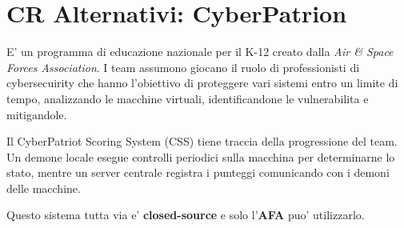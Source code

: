 \section{CR Alternativi:
CyberPatrion}\label{cr-alternativi-cyberpatrion}

E' un programma di educazione nazionale per il K-12 creato dalla
\emph{Air \& Space Forces Association}. I team assumono giocano il ruolo
di professionisti di cybersecuirity che hanno l'obiettivo di proteggere
vari sistemi entro un limite di tempo, analizzando le macchine virtuali,
identificandone le vulnerabilita e mitigandole.

Il CyberPatriot Scoring System (CSS) tiene traccia della progressione
del team. Un demone locale esegue controlli periodici sulla macchina per
determinarne lo stato, mentre un server centrale registra i punteggi
comunicando con i demoni delle macchine.

Questo sistema tutta via e' \textbf{closed-source} e solo l'\textbf{AFA}
puo' utilizzarlo.
